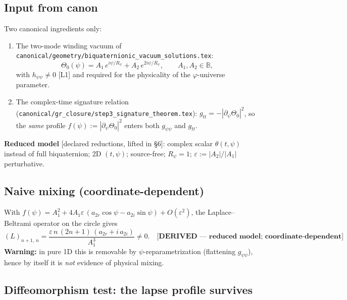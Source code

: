 \subsection{Input from canon}
\label{sec:bridge_input}

Two canonical ingredients only:
\begin{enumerate}
  \item The two-mode winding vacuum of
        \texttt{canonical/geometry/biquaternionic\_vacuum\_solutions.tex}:
        \begin{equation}
          \Theta_0(\psi) = A_1\,e^{i\psi/R_\psi} + A_2\,e^{2i\psi/R_\psi},
          \qquad A_1, A_2 \in \mathbb{B},
          \label{eq:bridge_vacuum}
        \end{equation}
        with $h_{\psi\psi} \neq 0$ [L1] and required for the physicality of the
        $\varphi$-universe parameter.
  \item The complex-time signature relation
        (\texttt{canonical/gr\_closure/step3\_signature\_theorem.tex}):
        $g_{tt} = -|\partial_\psi\Theta_0|^2$, so the \emph{same} profile
        $f(\psi) := |\partial_\psi\Theta_0|^2$ enters both $g_{\psi\psi}$ and $g_{tt}$.
\end{enumerate}

\noindent\textbf{Reduced model} [declared reductions, lifted in §6]:
complex scalar $\theta(t,\psi)$ instead of full biquaternion; 2D $(t,\psi)$;
source-free; $R_\psi = 1$; $\varepsilon := |A_2|/|A_1|$ perturbative.

\subsection{Naive mixing (coordinate-dependent)}
\label{sec:bridge_naive}

With $f(\psi) = A_1^2 + 4A_1\varepsilon\,(a_{2r}\cos\psi - a_{2i}\sin\psi) + O(\varepsilon^2)$,
the Laplace--Beltrami operator on the circle gives
\begin{equation}
  (L)_{n+1,\,n} = \frac{\varepsilon\,n\,(2n+1)\,(a_{2r} + i\,a_{2i})}{A_1^3} \neq 0.
  \quad\textbf{[DERIVED — reduced model; coordinate-dependent]}
\end{equation}
\textbf{Warning:} in pure 1D this is removable by $\psi$-reparametrization
(flattening $g_{\psi\psi}$), hence by itself it is \emph{not} evidence of physical mixing.

\subsection{Diffeomorphism test: the lapse profile survives}
\label{sec:bridge_diffeo}

